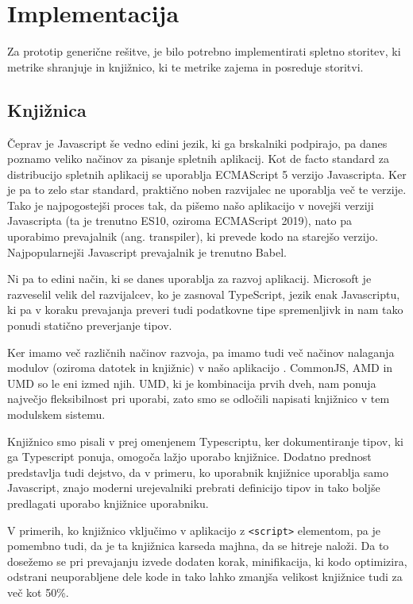 \documentclass[a4paper, 12pt]{book}
\begin{document}
\section{Implementacija}
\label{ch3:sec2}

Za prototip generične rešitve, je bilo potrebno implementirati spletno storitev, ki metrike shranjuje in knjižnico, ki te metrike zajema in posreduje storitvi.

\subsection{Knjižnica}
\label{ch3:sec2:sub1}

Čeprav je Javascript še vedno edini jezik, ki ga brskalniki podpirajo, pa danes poznamo veliko načinov za pisanje spletnih aplikacij. Kot de facto standard za distribucijo spletnih aplikacij se uporablja ECMAScript 5 verzijo Javascripta. Ker je pa to zelo star standard, praktično noben razvijalec ne uporablja več te verzije. Tako je najpogostejši proces tak, da pišemo našo aplikacijo v novejši verziji Javascripta (ta je trenutno ES10, oziroma ECMAScript 2019), nato pa uporabimo prevajalnik (ang. transpiler), ki prevede kodo na starejšo verzijo. Najpopularnejši Javascript prevajalnik je trenutno Babel.

Ni pa to edini način, ki se danes uporablja za razvoj aplikacij. Microsoft je razveselil velik del razvijalcev, ko je zasnoval TypeScript, jezik enak Javascriptu, ki pa v koraku prevajanja preveri tudi podatkovne tipe spremenljivk in nam tako ponudi statično preverjanje tipov.

Ker imamo več različnih načinov razvoja, pa imamo tudi več načinov nalaganja modulov (oziroma datotek in knjižnic) v našo aplikacijo \cite{js_modules}. CommonJS, AMD in UMD so le eni izmed njih. UMD, ki je kombinacija prvih dveh, nam ponuja največjo fleksibilnost pri uporabi, zato smo se odločili napisati knjižnico v tem modulskem sistemu.

Knjižnico smo pisali v prej omenjenem Typescriptu, ker dokumentiranje tipov, ki ga Typescript ponuja, omogoča lažjo uporabo knjižnice. Dodatno prednost predstavlja tudi dejstvo, da v primeru, ko uporabnik knjižnice uporablja samo Javascript, znajo moderni urejevalniki prebrati definicijo tipov in tako boljše predlagati uporabo knjižnice uporabniku.

V primerih, ko knjižnico vključimo v aplikacijo z \verb|<script>| elementom, pa je pomembno tudi, da je ta knjižnica karseda majhna, da se hitreje naloži. Da to dosežemo se pri prevajanju izvede dodaten korak, minifikacija, ki kodo optimizira, odstrani neuporabljene dele kode in tako lahko zmanjša velikost knjižnice tudi za več kot 50\%.
\end{document}
